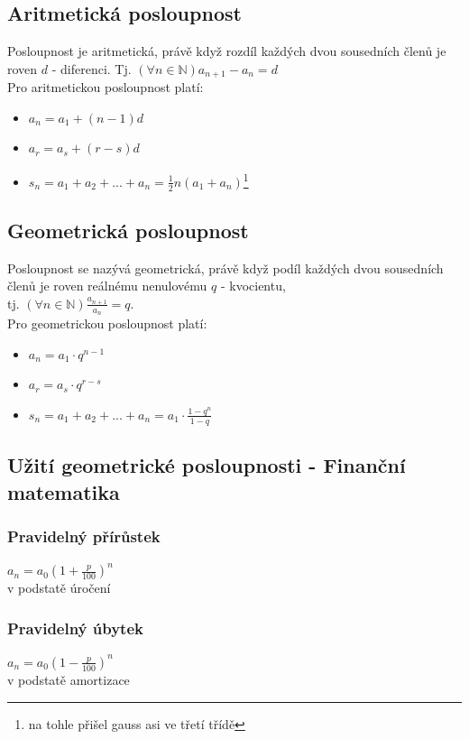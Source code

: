\documentclass[12pt, a4paper]{article}
\begin{document}
\subsection*{Aritmetická posloupnost}
Posloupnost je aritmetická, právě když rozdíl každých dvou sousedních členů je roven $d$ - diferenci.
Tj. $(\forall n \in \mathbb{N}) a_{n+1}-a_n=d$\\
Pro aritmetickou posloupnost platí:\\
\begin{itemize}
	\item $a_n = a_1 + (n-1)d$
	\item $a_r = a_s + (r-s)d$
	\item $s_n = a_1 + a_2 + ... + a_n = \frac{1}{2}n(a_1+a_n)$\footnote{na tohle přišel gauss asi ve třetí třídě}
\end{itemize}

\subsection*{Geometrická posloupnost}
Posloupnost se nazývá geometrická, právě když podíl každých dvou sousedních členů je roven reálnému nenulovému $q$ - kvocientu,\\ tj. $(\forall n \in \mathbb{N})\frac{a_{n+1}}{a_n}=q$.\\

Pro geometrickou posloupnost platí:\\
\begin{itemize}
	\item $a_n = a_1\cdot q^{n-1}$
	\item $a_r = a_s\cdot q^{r-s}$
	\item $s_n = a_1 + a_2 + ... + a_n = a_1\cdot \frac{1-q^n}{1-q}$
\end{itemize}

\subsection*{Užití geometrické posloupnosti - Finanční matematika}
\subsubsection*{Pravidelný přírůstek}
$a_n = a_0 (1+\frac{p}{100})^n$\\
v podstatě úročení
\subsubsection*{Pravidelný úbytek}
$a_n = a_0 (1-\frac{p}{100})^n$\\
v podstatě amortizace
\end{document}
